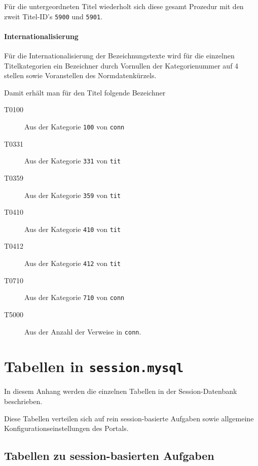 \documentclass[11pt, twoside, a4paper, BCOR8mm, DIV12, bibtotoc,idxtotoc]{scrbook}
\begin{document}
Für die untergeordneten Titel wiederholt sich diese gesamt Prozedur
mit den zweit Titel-ID's \texttt{5900} und \texttt{5901}.

\subsubsection{Internationalisierung}

Für die Internationalisierung der Bezeichnungstexte wird für die
einzelnen Titelkategorien ein Bezeichner durch Vornullen der
Kategorienummer auf 4 stellen sowie Voranstellen des Normdatenkürzels.

Damit erhält man für den Titel folgende Bezeichner

\begin{description}
\item[T0100] Aus der Kategorie \texttt{100} von \texttt{conn}
\item[T0331] Aus der Kategorie \texttt{331} von \texttt{tit}
\item[T0359] Aus der Kategorie \texttt{359} von \texttt{tit}
\item[T0410] Aus der Kategorie \texttt{410} von \texttt{tit}
\item[T0412] Aus der Kategorie \texttt{412} von \texttt{tit}
\item[T0710] Aus der Kategorie \texttt{710} von \texttt{conn}
\item[T5000] Aus der Anzahl der Verweise in \texttt{conn}.
\end{description}

\appendix

\chapter{Tabellen in \texttt{session.mysql}}

In diesem Anhang werden die einzelnen Tabellen in der
Session-Datenbank beschrieben.

Diese Tabellen verteilen sich auf rein session-basierte Aufgaben sowie
allgemeine Konfigurations\-ein\-stellungen des Portals.


\section{Tabellen zu session-basierten Aufgaben}
\end{document}
